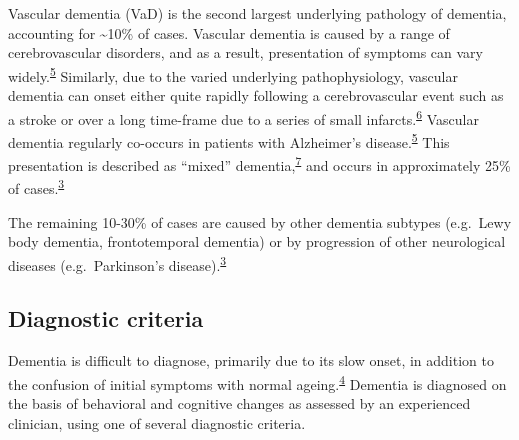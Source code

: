 \documentclass[a4paper, twoside]{templates/ociamthesis}
\begin{document}
Vascular dementia (VaD) is the second largest underlying pathology of dementia, accounting for \textasciitilde10\% of cases. Vascular dementia is caused by a range of cerebrovascular disorders, and as a result, presentation of symptoms can vary widely.\textsuperscript{\protect\hyperlink{ref-iadecola2013}{5}} Similarly, due to the varied underlying pathophysiology, vascular dementia can onset either quite rapidly following a cerebrovascular event such as a stroke or over a long time-frame due to a series of small infarcts.\textsuperscript{\protect\hyperlink{ref-venkat2015}{6}} Vascular dementia regularly co-occurs in patients with Alzheimer's disease.\textsuperscript{\protect\hyperlink{ref-iadecola2013}{5}} This presentation is described as ``mixed'' dementia,\textsuperscript{\protect\hyperlink{ref-custodio2017}{7}} and occurs in approximately 25\% of cases.\textsuperscript{\protect\hyperlink{ref-burns2009}{3}}

The remaining 10-30\% of cases are caused by other dementia subtypes (e.g.~Lewy body dementia, frontotemporal dementia) or by progression of other neurological diseases (e.g.~Parkinson's disease).\textsuperscript{\protect\hyperlink{ref-burns2009}{3}}

\hypertarget{diagnostic-criteria}{%
\subsection{Diagnostic criteria}\label{diagnostic-criteria}}

Dementia is difficult to diagnose, primarily due to its slow onset, in addition to the confusion of initial symptoms with normal ageing.\textsuperscript{\protect\hyperlink{ref-robinson2015}{4}} Dementia is diagnosed on the basis of behavioral and cognitive changes as assessed by an experienced clinician, using one of several diagnostic criteria.

~
\end{document}
